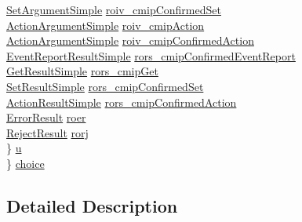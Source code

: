 \begin{DoxyCompactItemize}
\begin{tabbing}
\>\>\hyperlink{ieee__11073__phd__types_8h_a43ff8ecfd35a12bcb7eb4bc974f1ffb2}{SetArgumentSimple} \hyperlink{struct___d_a_t_a__apdu_a20cb369d39461e9edd129a2020c5b730}{roiv\_cmipConfirmedSet}\\
\>\>\hyperlink{ieee__11073__phd__types_8h_a4a440fc5b632456725feaa27583ee5c6}{ActionArgumentSimple} \hyperlink{struct___d_a_t_a__apdu_abad510647acd238e619612830f561188}{roiv\_cmipAction}\\
\>\>\hyperlink{ieee__11073__phd__types_8h_a4a440fc5b632456725feaa27583ee5c6}{ActionArgumentSimple} \hyperlink{struct___d_a_t_a__apdu_ab78ef96e3a5c04a9409f379f90fb0acb}{roiv\_cmipConfirmedAction}\\
\>\>\hyperlink{ieee__11073__phd__types_8h_aea1027cc2ee7615b0369ba7eb9c4cbba}{EventReportResultSimple} \hyperlink{struct___d_a_t_a__apdu_a2ff6d37a0da3b286cfc42e9ddd88eb94}{rors\_cmipConfirmedEventReport}\\
\>\>\hyperlink{ieee__11073__phd__types_8h_a443adc4af38ff1346c6027f9db71b74e}{GetResultSimple} \hyperlink{struct___d_a_t_a__apdu_a97e81a762d3f8e8dfcee6b20c3061e19}{rors\_cmipGet}\\
\>\>\hyperlink{ieee__11073__phd__types_8h_ace9edc9196886f6a75e892e58d043c9e}{SetResultSimple} \hyperlink{struct___d_a_t_a__apdu_a86e45f8285bcb8daa49ffd57fe286a4b}{rors\_cmipConfirmedSet}\\
\>\>\hyperlink{ieee__11073__phd__types_8h_ac72b7bc301b6c4e7ae500ffa6ac0fb9e}{ActionResultSimple} \hyperlink{struct___d_a_t_a__apdu_a7fa1e37066d8853ad3bdc58fdcc30058}{rors\_cmipConfirmedAction}\\
\>\>\hyperlink{ieee__11073__phd__types_8h_af01b35027bb3cc93efb2765f4c620017}{ErrorResult} \hyperlink{struct___d_a_t_a__apdu_a768fc350526f93d1e5d02875f6050c05}{roer}\\
\>\>\hyperlink{ieee__11073__phd__types_8h_a9392e22f73de1af564915253afed45c3}{RejectResult} \hyperlink{struct___d_a_t_a__apdu_acda4a4bd23c9a1f3738b5becff330964}{rorj}\\
\>\} \hyperlink{struct___d_a_t_a__apdu_ac0b0785c6a2a08fbae3111d42ffa45e8}{u}\\
\} \hyperlink{struct___d_a_t_a__apdu_a8334e01b255f1a5eec983b216ae9fad6}{choice}\\

\end{tabbing}\end{DoxyCompactItemize}


\subsection{Detailed Description}


